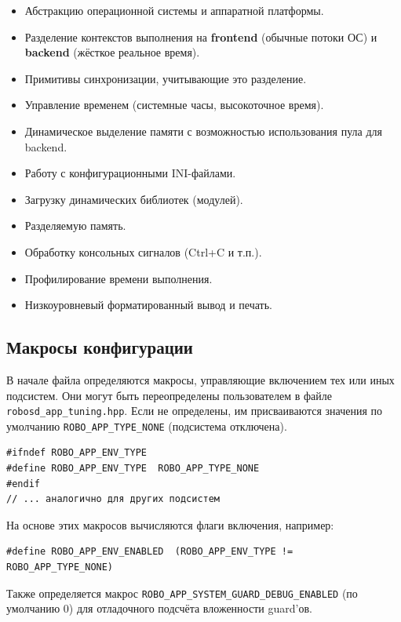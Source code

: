 \documentclass[a4paper,12pt]{article}
\begin{document}
\begin{itemize}
    \item Абстракцию операционной системы и аппаратной платформы.
    \item Разделение контекстов выполнения на \textbf{frontend} (обычные потоки ОС) и \textbf{backend} (жёсткое реальное время).
    \item Примитивы синхронизации, учитывающие это разделение.
    \item Управление временем (системные часы, высокоточное время).
    \item Динамическое выделение памяти с возможностью использования пула для backend.
    \item Работу с конфигурационными INI-файлами.
    \item Загрузку динамических библиотек (модулей).
    \item Разделяемую память.
    \item Обработку консольных сигналов (Ctrl+C и т.п.).
    \item Профилирование времени выполнения.
    \item Низкоуровневый форматированный вывод и печать.
\end{itemize}

\subsection{Макросы конфигурации}

В начале файла определяются макросы, управляющие включением тех или иных подсистем. Они могут быть переопределены пользователем в файле \texttt{robosd\_app\_tuning.hpp}. Если не определены, им присваиваются значения по умолчанию \texttt{ROBO\_APP\_TYPE\_NONE} (подсистема отключена).

\begin{lstlisting}[caption={Макросы выбора реализации}]
#ifndef ROBO_APP_ENV_TYPE 
#define ROBO_APP_ENV_TYPE  ROBO_APP_TYPE_NONE
#endif
// ... аналогично для других подсистем
\end{lstlisting}

На основе этих макросов вычисляются флаги включения, например:
\begin{lstlisting}
#define ROBO_APP_ENV_ENABLED  (ROBO_APP_ENV_TYPE != ROBO_APP_TYPE_NONE)
\end{lstlisting}

Также определяется макрос \texttt{ROBO\_APP\_SYSTEM\_GUARD\_DEBUG\_ENABLED} (по умолчанию 0) для отладочного подсчёта вложенности guard'ов.
\end{document}
